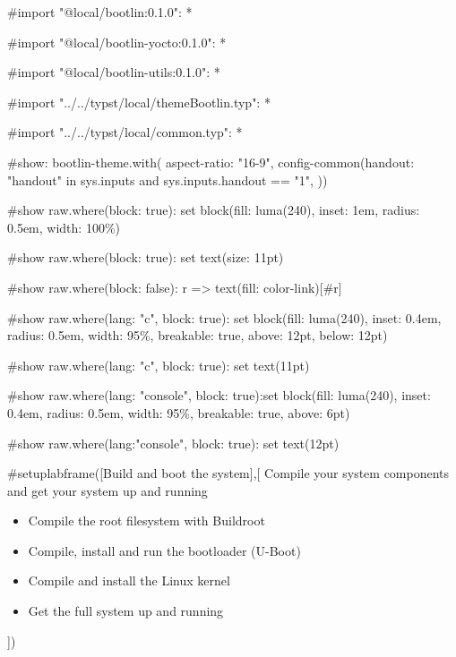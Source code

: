 #import "@local/bootlin:0.1.0": *

#import "@local/bootlin-yocto:0.1.0": *

#import "@local/bootlin-utils:0.1.0": *

#import "../../typst/local/themeBootlin.typ": *

#import "../../typst/local/common.typ": *

#show: bootlin-theme.with( aspect-ratio: "16-9", config-common(handout: "handout" in sys.inputs and sys.inputs.handout == "1", ))

#show raw.where(block: true): set block(fill: luma(240), inset: 1em, radius: 0.5em, width: 100\%)

#show raw.where(block: true): set text(size: 11pt)

#show raw.where(block: false): r => text(fill: color-link)[#r]

#show raw.where(lang: "c", block: true): set block(fill: luma(240), inset: 0.4em, radius: 0.5em, width: 95\%, breakable: true, above: 12pt, below: 12pt)

#show raw.where(lang: "c", block: true): set text(11pt)

#show raw.where(lang: "console", block: true):set block(fill: luma(240), inset: 0.4em, radius: 0.5em, width: 95\%, breakable: true, above: 6pt)

#show raw.where(lang:"console", block: true): set text(12pt)

 #setuplabframe([Build and boot the system],[
  Compile your system components and get your system up and running
  \begin{itemize}
  \item Compile the root filesystem with Buildroot
  \item Compile, install and run the bootloader (U-Boot)
  \item Compile and install the Linux kernel
  \item Get the full system up and running
  \end{itemize}
])
